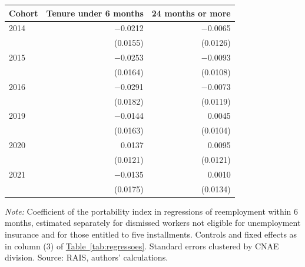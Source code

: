 {\footnotesize
\begin{threeparttable}
\begin{tabular}{lrr}
\toprule
Cohort & Tenure under 6 months & 24 months or more \\
\midrule
2014 & $-$0.0212 & $-$0.0065 \\
 & (0.0155) & (0.0126) \\
2015 & $-$0.0253 & $-$0.0093 \\
 & (0.0164) & (0.0108) \\
2016 & $-$0.0291 & $-$0.0073 \\
 & (0.0182) & (0.0119) \\
2019 & $-$0.0144 & 0.0045 \\
 & (0.0163) & (0.0104) \\
2020 & 0.0137 & 0.0095 \\
 & (0.0121) & (0.0121) \\
2021 & $-$0.0135 & 0.0010 \\
 & (0.0175) & (0.0134) \\
\bottomrule
\end{tabular}
\begin{tablenotes}[flushleft]\footnotesize
\item \textit{Note:} Coefficient of the portability index in regressions of reemployment within 6 months, estimated separately for dismissed workers not eligible for unemployment insurance and for those entitled to five installments. Controls and fixed effects as in column (3) of \hyperref[tab:regressoes]{Table~\ref*{tab:regressoes}}. Standard errors clustered by CNAE division. Source: RAIS, authors' calculations.
\end{tablenotes}
\end{threeparttable}
}
